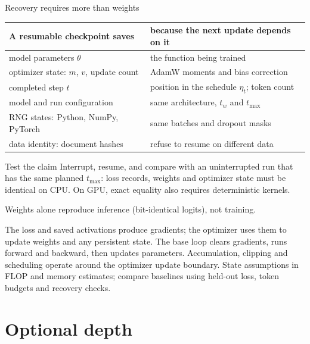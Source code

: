 \documentclass[handout]{beamer}
\begin{document}
\begin{frame}{Recovery requires more than weights}
  \small
  \begin{center}
    \begin{tabular}{@{}ll@{}}
      \toprule
      A resumable checkpoint saves & because the next update depends on it \\
      \midrule
      model parameters $\theta$ & the function being trained \\
      optimizer state: $m$, $v$, update count & AdamW moments and bias correction \\
      completed step $t$ & position in the schedule $\eta_t$; token count \\
      model and run configuration & same architecture, $t_w$ and $t_{\max}$ \\
      RNG states: Python, NumPy, PyTorch & same batches and dropout masks \\
      data identity: document hashes & refuse to resume on different data \\
      \bottomrule
    \end{tabular}
  \end{center}
  \begin{block}{Test the claim}
    Interrupt, resume, and compare with an uninterrupted run that has the same planned $t_{\max}$: loss records, weights and optimizer state must be identical on CPU. On GPU, exact equality also requires deterministic kernels.
  \end{block}
  \footnotesize Weights alone reproduce inference (bit-identical logits), not training.
\end{frame}

\takeaways
{The loss and saved activations produce gradients; the optimizer uses them to update weights and any persistent state.}
{The base loop clears gradients, runs forward and backward, then updates parameters.}
{Accumulation, clipping and scheduling operate around the optimizer update boundary.}
{State assumptions in FLOP and memory estimates; compare baselines using held-out loss, token budgets and recovery checks.}

\appendix
\section{Optional depth}
\end{document}
